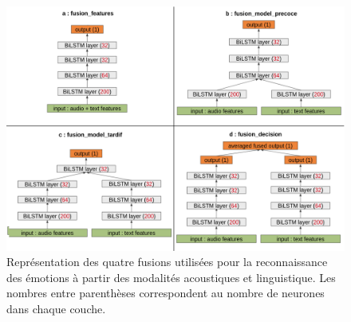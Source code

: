 \begin{figure}[thb]
  \centering
    \includegraphics[width=18cm]{./Chapitre6/figures/archi_fusion.png}
    \caption{Représentation des quatre fusions utilisées pour la reconnaissance des émotions à partir des modalités acoustiques et linguistique. Les nombres entre parenthèses correspondent au nombre de neurones dans chaque couche.}
    \label{fig:archi_fusion}
\end{figure}
